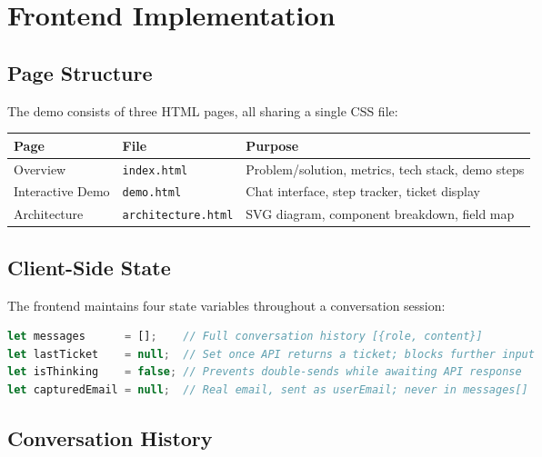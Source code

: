 \documentclass[12pt, a4paper]{article}
\begin{document}
\section{Frontend Implementation}

\subsection{Page Structure}

The demo consists of three HTML pages, all sharing a single CSS file:

\begin{center}
\begin{tabular}{lll}
\toprule
\textbf{Page} & \textbf{File} & \textbf{Purpose} \\
\midrule
Overview & \texttt{index.html} & Problem/solution, metrics, tech stack, demo steps \\
Interactive Demo & \texttt{demo.html} & Chat interface, step tracker, ticket display \\
Architecture & \texttt{architecture.html} & SVG diagram, component breakdown, field map \\
\bottomrule
\end{tabular}
\end{center}

\subsection{Client-Side State}

The frontend maintains four state variables throughout a conversation session:

\begin{lstlisting}[language=JavaScript, caption={Client-side state variables (js/demo.js)}]
let messages      = [];    // Full conversation history [{role, content}]
let lastTicket    = null;  // Set once API returns a ticket; blocks further input
let isThinking    = false; // Prevents double-sends while awaiting API response
let capturedEmail = null;  // Real email, sent as userEmail; never in messages[]
\end{lstlisting}

\subsection{Conversation History}
\end{document}
